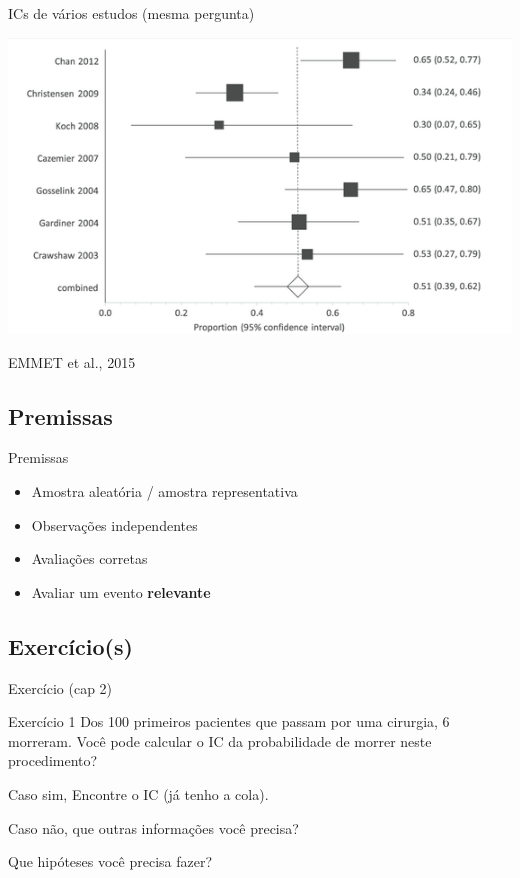 \documentclass{beamer}
\begin{document}
\begin{frame}{\scriptsize ICs de vários estudos (mesma pergunta)}
  \begin{center}
    \includegraphics[width=.8\textwidth]{Cap2/IC-prop-n-amostras.png}
  \end{center}

  \vfill
  \hfill \tiny EMMET et al., 2015
\end{frame}

\subsection{Premissas}

\begin{frame}{\scriptsize Premissas}
  \begin{itemize}
    \footnotesize
  \item Amostra aleatória / amostra representativa
  \bigskip
  \item Observações independentes
  \bigskip
  \item Avaliações corretas
  \bigskip
  \item Avaliar um evento {\bf relevante}
  \end{itemize}
\end{frame}

\subsection{Exercício(s)}

\begin{frame}{\scriptsize Exercício (cap 2)}
  \begin{block}{Exercício 1}
    \footnotesize
    Dos 100 primeiros pacientes que passam por uma cirurgia, 6 morreram.
    Você pode calcular o IC da probabilidade de morrer neste procedimento?

    \bigskip
    Caso sim, Encontre o IC (já tenho a cola).

    Caso não, que outras informações você precisa?

    Que hipóteses você precisa fazer?
  \end{block}
\end{frame}
\end{document}
